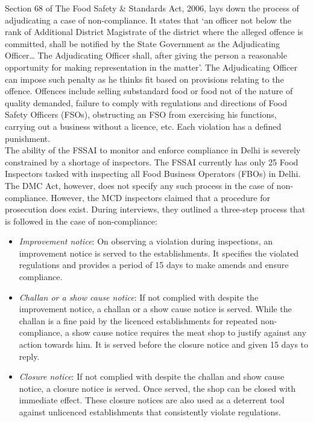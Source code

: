 \documentclass[a4paper, 12pt]{article}
\begin{document}
Section 68 of The Food Safety \& Standards Act, 2006, lays down the process of adjudicating a case of non-compliance. It states that ‘an officer not below the rank of Additional District Magistrate of the district where the alleged offence is committed, shall be notified by the State Government as the Adjudicating Officer… The Adjudicating Officer shall, after giving the person a reasonable opportunity for making representation in the matter’. The Adjudicating Officer can impose such penalty as he thinks fit based on provisions relating to the offence. Offences include selling substandard food or food not of the nature of quality demanded, failure to comply with regulations and directions of Food Safety Officers (FSOs), obstructing an FSO from exercising his functions, carrying out a business without a licence, etc. Each violation has a defined punishment.\\

The ability of the FSSAI to monitor and enforce compliance in Delhi is severely constrained by a shortage of inspectors. The FSSAI currently has only 25 Food Inspectors tasked with inspecting all Food Business Operators (FBOs) in Delhi.\\

The DMC Act, however, does not specify any such process in the case of non-compliance. However, the MCD inspectors claimed that a procedure for prosecution does exist. During interviews, they outlined a three-step process that is followed in the case of non-compliance:\\
\begin{itemize}
\item \textit{Improvement notice}: On observing a violation during inspections, an improvement notice is served to the establishments. It specifies the violated regulations and provides a period of 15 days to make amends and ensure compliance.
\item \textit{Challan or a show cause notice}: If not complied with despite the improvement notice, a challan or a show cause notice is served. While the challan is a fine paid by the licenced establishments for repeated non-compliance, a show cause notice requires the meat shop to justify against any action towards him. It is served before the closure notice and given 15 days to reply. 
\item \textit{Closure notice}: If not complied with despite the challan and show cause notice, a closure notice is served. Once served, the shop can be closed with immediate effect. These closure notices are also used as a deterrent tool against unlicenced establishments that consistently violate regulations. \\
\end{itemize}
\end{document}
